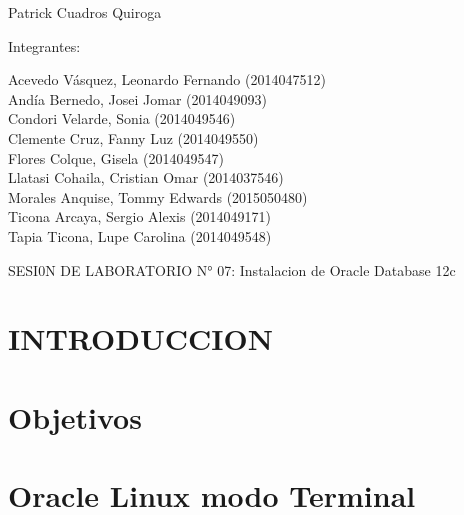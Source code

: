 \documentclass[12pt,letterpaper]{article}
\begin{document}
\begin{titlepage}
\begin{center}
\vspace*{0.1in}
\begin{large}
 Patrick Cuadros Quiroga\\
\end{large}

\vspace*{0.2in}
\vspace*{0.1in}
\begin{large}
Integrantes: \\
\begin{flushleft}
Acevedo Vásquez, Leonardo Fernando 	(2014047512) \\
Andía Bernedo, Josei Jomar 			(2014049093) \\
Condori Velarde, Sonia          	(2014049546) \\
Clemente Cruz, Fanny Luz    		(2014049550) \\
Flores Colque, Gisela           	(2014049547) \\
Llatasi Cohaila, Cristian Omar		(2014037546) \\
Morales Anquise, Tommy Edwards 		(2015050480) \\
Ticona Arcaya, Sergio Alexis		(2014049171) \\
Tapia Ticona, Lupe Carolina			(2014049548) \\
\end{flushleft}
\end{large}
\end{center}

\end{titlepage}




 \tableofcontents
 \newpage
SESI0N DE LABORATORIO N° 07:
Instalacion de Oracle Database 12c
 
\section{INTRODUCCION} 
 \newpage
\section{Objetivos} 
\newpage
\section{Oracle Linux modo Terminal}
\end{document}
